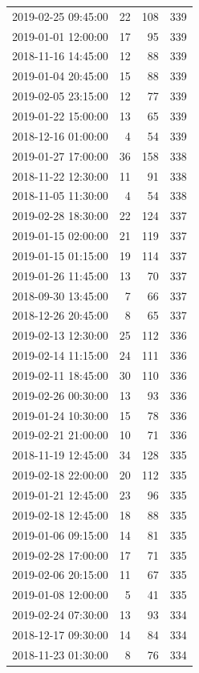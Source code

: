 \begin{tabular}{lrrr}
2019-02-25 09:45:00 & 22 & 108 & 339 \\
2019-01-01 12:00:00 & 17 & 95 & 339 \\
2018-11-16 14:45:00 & 12 & 88 & 339 \\
2019-01-04 20:45:00 & 15 & 88 & 339 \\
2019-02-05 23:15:00 & 12 & 77 & 339 \\
2019-01-22 15:00:00 & 13 & 65 & 339 \\
2018-12-16 01:00:00 & 4 & 54 & 339 \\
2019-01-27 17:00:00 & 36 & 158 & 338 \\
2018-11-22 12:30:00 & 11 & 91 & 338 \\
2018-11-05 11:30:00 & 4 & 54 & 338 \\
2019-02-28 18:30:00 & 22 & 124 & 337 \\
2019-01-15 02:00:00 & 21 & 119 & 337 \\
2019-01-15 01:15:00 & 19 & 114 & 337 \\
2019-01-26 11:45:00 & 13 & 70 & 337 \\
2018-09-30 13:45:00 & 7 & 66 & 337 \\
2018-12-26 20:45:00 & 8 & 65 & 337 \\
2019-02-13 12:30:00 & 25 & 112 & 336 \\
2019-02-14 11:15:00 & 24 & 111 & 336 \\
2019-02-11 18:45:00 & 30 & 110 & 336 \\
2019-02-26 00:30:00 & 13 & 93 & 336 \\
2019-01-24 10:30:00 & 15 & 78 & 336 \\
2019-02-21 21:00:00 & 10 & 71 & 336 \\
2018-11-19 12:45:00 & 34 & 128 & 335 \\
2019-02-18 22:00:00 & 20 & 112 & 335 \\
2019-01-21 12:45:00 & 23 & 96 & 335 \\
2019-02-18 12:45:00 & 18 & 88 & 335 \\
2019-01-06 09:15:00 & 14 & 81 & 335 \\
2019-02-28 17:00:00 & 17 & 71 & 335 \\
2019-02-06 20:15:00 & 11 & 67 & 335 \\
2019-01-08 12:00:00 & 5 & 41 & 335 \\
2019-02-24 07:30:00 & 13 & 93 & 334 \\
2018-12-17 09:30:00 & 14 & 84 & 334 \\
2018-11-23 01:30:00 & 8 & 76 & 334 \\

\end{tabular}
